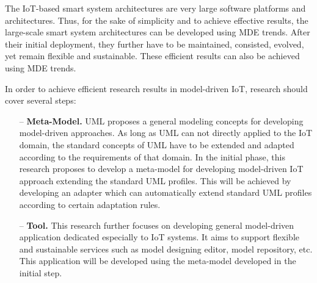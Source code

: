 The IoT-based smart system architectures are very large software platforms and architectures. Thus, for the sake of simplicity and to achieve effective results, the large-scale smart system architectures can be developed using MDE trends. After their initial deployment, they further have to be maintained, consisted, evolved, yet remain flexible and sustainable. These efficient results can also be achieved using MDE trends. 

In order to achieve efficient research results in model-driven IoT, research should cover several steps:
\begin{itemize}
\item[--] \textbf{Meta-Model.} UML proposes a general modeling concepts for developing model-driven approaches. As long as UML can not directly applied to the IoT domain, the standard concepts of UML have to be extended and adapted according to the requirements of that domain. In the initial phase, this research proposes to develop a meta-model for developing model-driven IoT approach extending the standard UML profiles. This will be achieved by developing an adapter which can automatically extend standard UML profiles according to certain adaptation rules.
\item[--] \textbf{Tool.} This research further focuses on developing general model-driven application dedicated especially to IoT systems. It aims to support flexible and sustainable services such as model designing editor, model repository, etc. This application will be developed using the meta-model developed in the initial step.
\end{itemize}
